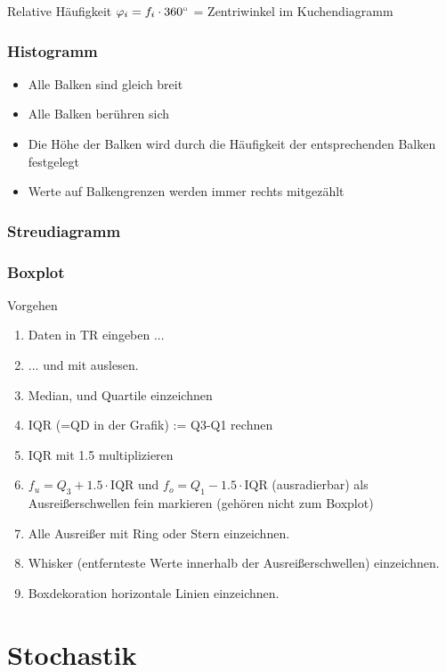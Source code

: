 \begin{multicols}{2}
\begin{definition}{Relative Häufigkeit}{}
$\varphi_i = f_i\cdot{}360^\circ$ = Zentriwinkel im Kuchendiagramm
\end{definition}



\subsubsection{Histogramm}
\begin{itemize}
\item Alle Balken sind gleich breit
\item Alle Balken berühren sich
\item Die Höhe der Balken wird durch die Häufigkeit der entsprechenden
Balken festgelegt
\item Werte auf Balkengrenzen werden immer rechts mitgezählt
\end{itemize}

\subsubsection{Streudiagramm}

\newpage
\subsubsection{Boxplot}
Vorgehen
\begin{enumerate}
\item Daten in TR eingeben ...
\item ... und mit  auslesen.
\item Median, und Quartile einzeichnen
\item IQR (=QD in der Grafik) := Q3-Q1 rechnen
\item IQR mit 1.5 multiplizieren
\item $f_u = Q_3 + 1.5\cdot{}\textrm{IQR}$ und $f_o=Q_1 - 1.5\cdot{}\textrm{IQR}$ (ausradierbar) als
Ausreißerschwellen fein markieren (gehören nicht zum Boxplot)
\item Alle Ausreißer mit Ring oder Stern einzeichnen.
\item Whisker (entfernteste Werte innerhalb der Ausreißerschwellen)
einzeichnen.
\item Boxdekoration horizontale Linien einzeichnen.
\end{enumerate}


\hrulefill
\section{Stochastik}


\end{multicols}
